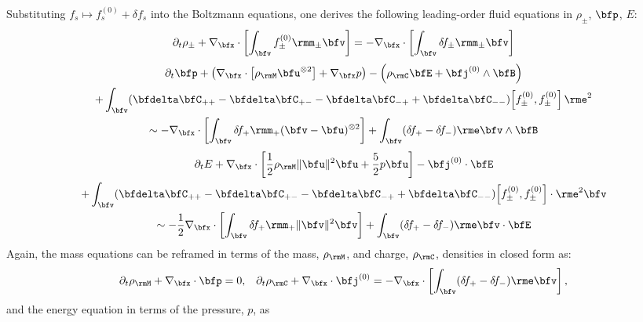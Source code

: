     Substituting $f_{s}  \mapsto  f_{s}^{(0)} + \delta\! f_{s}$ into the Boltzmann equations, one derives the following leading-order fluid equations in $\rho_{\pm}$, $\bfp$, $E$:
    \begin{equation}
        \partial_{t}\rho_{\pm} + \nabla_{\bfx}\cdot\left[\int_{\bfv}f_{\pm}^{(0)}\rmm_{\pm}\bfv\right]  =  - \nabla_{\bfx}\cdot\left[\int_{\bfv}\delta\! f_{\pm}\rmm_{\pm}\bfv\right]
    \end{equation}
    \vspace{-20pt}
    \begin{multline}
        \partial_{t}\bfp + \left(\nabla_{\bfx}\cdot\left[\rho_{\rmM}\bfu^{\otimes 2}\right] + \nabla_{\bfx}p\right) - \left(\rho_{\rmC}\bfE + \bfj^{(0)}\wedge\bfB\right) \\
        + \int_{\bfv}(\bfdelta\bfC_{++} - \bfdelta\bfC_{+-} - \bfdelta\bfC_{-+} + \bfdelta\bfC_{--})\!\left[f_{\pm}^{(0)}, f_{\pm}^{(0)}\right]\rme^{2}  \\
        \sim  - \nabla_{\bfx}\cdot\left[\int_{\bfv}\delta\! f_{+}\rmm_{+}(\bfv - \bfu)^{\otimes 2}\right] + \int_{\bfv}(\delta\! f_{+} - \delta\! f_{-})\rme\bfv\wedge\bfB
    \end{multline}
    \vspace{-25pt}
    \begin{multline}
        \partial_{t}E + \nabla_{\bfx}\cdot\left[\frac{1}{2}\rho_{\rmM}\|\bfu\|^{2}\bfu + \frac{5}{2}p\bfu\right] - \bfj^{(0)}\cdot\bfE  \\
        + \int_{\bfv}(\bfdelta\bfC_{++} - \bfdelta\bfC_{+-} - \bfdelta\bfC_{-+} + \bfdelta\bfC_{--})\!\left[f_{\pm}^{(0)}, f_{\pm}^{(0)}\right]\cdot\rme^{2}\bfv  \\
        \sim  - \frac{1}{2}\nabla_{\bfx}\cdot\left[\int_{\bfv}\delta\! f_{+}\rmm_{+}\|\bfv\|^{2}\bfv\right] + \int_{\bfv}(\delta\! f_{+} - \delta\! f_{-})\rme\bfv\cdot\bfE
    \end{multline}
    Again, the mass equations can be reframed in terms of the mass, $\rho_{\rmM}$, and charge, $\rho_{\rmC}$, densities in closed form as:
    \begin{align}
        \partial_{t}\rho_{\rmM} + \nabla_{\bfx}\cdot\bfp  =  0,  &&
        \partial_{t}\rho_{\rmC} + \nabla_{\bfx}\cdot\bfj^{(0)}  =  - \nabla_{\bfx}\cdot\left[\int_{\bfv}(\delta\! f_{+} - \delta\! f_{-})\rme\bfv\right],
    \end{align}
    and the energy equation in terms of the pressure, $p$, as
